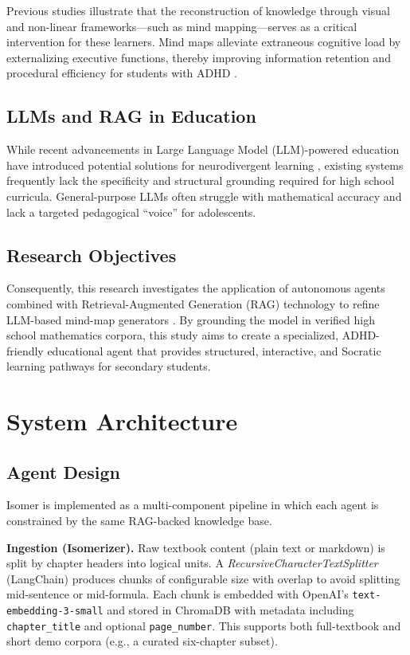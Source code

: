 \documentclass[sigplan,screen]{acmart}
\begin{document}
Previous studies illustrate that the reconstruction of knowledge through visual and non-linear frameworks---such as mind mapping---serves as a critical intervention for these learners. Mind maps alleviate extraneous cognitive load by externalizing executive functions, thereby improving information retention and procedural efficiency for students with ADHD \cite{french2019barriers}.

\subsection{LLMs and RAG in Education}
While recent advancements in Large Language Model (LLM)-powered education have introduced potential solutions for neurodivergent learning \cite{tang2025exploring}, existing systems frequently lack the specificity and structural grounding required for high school curricula. General-purpose LLMs often struggle with mathematical accuracy and lack a targeted pedagogical ``voice'' for adolescents.

\subsection{Research Objectives}
Consequently, this research investigates the application of autonomous agents combined with Retrieval-Augmented Generation (RAG) technology to refine LLM-based mind-map generators \cite{tang2025exploring}. By grounding the model in verified high school mathematics corpora, this study aims to create a specialized, ADHD-friendly educational agent that provides structured, interactive, and Socratic learning pathways for secondary students.

\section{System Architecture}

\subsection{Agent Design}
Isomer is implemented as a multi-component pipeline in which each agent is constrained by the same RAG-backed knowledge base.

\textbf{Ingestion (Isomerizer).} Raw textbook content (plain text or markdown) is split by chapter headers into logical units. A \emph{RecursiveCharacterTextSplitter} (LangChain) produces chunks of configurable size with overlap to avoid splitting mid-sentence or mid-formula. Each chunk is embedded with OpenAI's \texttt{text-embedding-3-small} and stored in ChromaDB with metadata including \texttt{chapter\_title} and optional \texttt{page\_number}. This supports both full-textbook and short demo corpora (e.g., a curated six-chapter subset).
\end{document}
